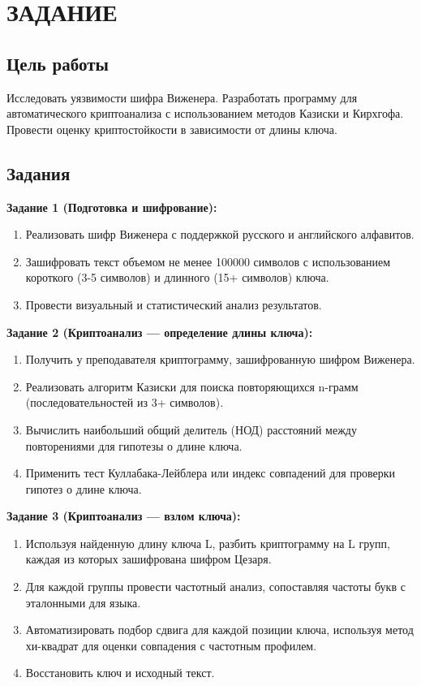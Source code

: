 \chapter*{ЗАДАНИЕ}

\section*{Цель работы}

Исследовать уязвимости шифра Виженера. Разработать программу для автоматического криптоанализа с использованием методов Казиски и Кирхгофа. Провести оценку криптостойкости в зависимости от длины ключа.

\section*{Задания}

\textbf{Задание 1 (Подготовка и шифрование):}
\begin{enumerate}
    \item Реализовать шифр Виженера с поддержкой русского и английского алфавитов.
    \item Зашифровать текст объемом не менее 100000 символов с использованием короткого (3-5 символов) и длинного (15+ символов) ключа.
    \item Провести визуальный и статистический анализ результатов.
\end{enumerate}

\textbf{Задание 2 (Криптоанализ --- определение длины ключа):}
\begin{enumerate}
    \item Получить у преподавателя криптограмму, зашифрованную шифром Виженера.
    \item Реализовать алгоритм Казиски для поиска повторяющихся n-грамм (последовательностей из 3+ символов).
    \item Вычислить наибольший общий делитель (НОД) расстояний между повторениями для гипотезы о длине ключа.
    \item Применить тест Куллабака-Лейблера или индекс совпадений для проверки гипотез о длине ключа.
\end{enumerate}

\textbf{Задание 3 (Криптоанализ --- взлом ключа):}
\begin{enumerate}
    \item Используя найденную длину ключа L, разбить криптограмму на L групп, каждая из которых зашифрована шифром Цезаря.
    \item Для каждой группы провести частотный анализ, сопоставляя частоты букв с эталонными для языка.
    \item Автоматизировать подбор сдвига для каждой позиции ключа, используя метод хи-квадрат для оценки совпадения с частотным профилем.
    \item Восстановить ключ и исходный текст.
\end{enumerate}

